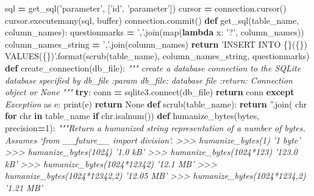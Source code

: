 \documentclass[12pt,oneside]{reedthesis}
\newenvironment{Shaded}{\begin{snugshade}}{\end{snugshade}}
\newcommand{\KeywordTok}[1]{\textcolor[rgb]{0.13,0.29,0.53}{\textbf{#1}}}
\newcommand{\DecValTok}[1]{\textcolor[rgb]{0.00,0.00,0.81}{#1}}
\newcommand{\SpecialCharTok}[1]{\textcolor[rgb]{0.00,0.00,0.00}{#1}}
\newcommand{\StringTok}[1]{\textcolor[rgb]{0.31,0.60,0.02}{#1}}
\newcommand{\ImportTok}[1]{#1}
\newcommand{\CommentTok}[1]{\textcolor[rgb]{0.56,0.35,0.01}{\textit{#1}}}
\newcommand{\VariableTok}[1]{\textcolor[rgb]{0.00,0.00,0.00}{#1}}
\newcommand{\ControlFlowTok}[1]{\textcolor[rgb]{0.13,0.29,0.53}{\textbf{#1}}}
\newcommand{\OperatorTok}[1]{\textcolor[rgb]{0.81,0.36,0.00}{\textbf{#1}}}
\newcommand{\BuiltInTok}[1]{#1}
\newcommand{\ExtensionTok}[1]{#1}
\newcommand{\PreprocessorTok}[1]{\textcolor[rgb]{0.56,0.35,0.01}{\textit{#1}}}
\newcommand{\NormalTok}[1]{#1}
\theoremstyle{definition}
\theoremstyle{definition}
\theoremstyle{definition}
\theoremstyle{remark}
\begin{document}
\begin{Shaded}
\begin{Highlighting}[]
{{{{{\NormalTok{    sql }\OperatorTok{=}\NormalTok{ get_sql(}\StringTok{'parameter'}\NormalTok{, [}\StringTok{'id'}\NormalTok{, }\StringTok{'parameter'}\NormalTok{])}
\NormalTok{    cursor }\OperatorTok{=}\NormalTok{ connection.cursor()}
\NormalTok{    cursor.executemany(sql, }\BuiltInTok{buffer}\NormalTok{)}
\NormalTok{    connection.commit()}
\KeywordTok{def}\NormalTok{ get_sql(table_name, column_names):}
\NormalTok{    questionmarks }\OperatorTok{=} \StringTok{','}\NormalTok{.join(}\BuiltInTok{map}\NormalTok{(}\KeywordTok{lambda}\NormalTok{ x: }\StringTok{'?'}\NormalTok{, column_names))}
\NormalTok{    column_names_string }\OperatorTok{=} \StringTok{','}\NormalTok{.join(column_names)}
    \ControlFlowTok{return} \StringTok{'INSERT INTO }\SpecialCharTok{\{\}}\StringTok{(}\SpecialCharTok{\{\}}\StringTok{) VALUES(}\SpecialCharTok{\{\}}\StringTok{)'}\NormalTok{.}\BuiltInTok{format}\NormalTok{(scrub(table_name), }
\NormalTok{      column_names_string, questionmarks)}
\KeywordTok{def}\NormalTok{ create_connection(db_file):}
    \CommentTok{""" create a database connection to the SQLite database}
\CommentTok{        specified by db_file}
\CommentTok{    :param db_file: database file}
\CommentTok{    :return: Connection object or None}
\CommentTok{    """}
    \ControlFlowTok{try}\NormalTok{:}
\NormalTok{        conn }\OperatorTok{=}\NormalTok{ sqlite3.}\ExtensionTok{connect}\NormalTok{(db_file)}
        \ControlFlowTok{return}\NormalTok{ conn}
    \ControlFlowTok{except} \PreprocessorTok{Exception} \ImportTok{as}\NormalTok{ e:}
        \BuiltInTok{print}\NormalTok{(e)}
    \ControlFlowTok{return} \VariableTok{None}
\KeywordTok{def}\NormalTok{ scrub(table_name):}
    \ControlFlowTok{return} \StringTok{''}\NormalTok{.join( }\BuiltInTok{chr} \ControlFlowTok{for} \BuiltInTok{chr} \KeywordTok{in}\NormalTok{ table_name }\ControlFlowTok{if} \BuiltInTok{chr}\NormalTok{.isalnum())}
\KeywordTok{def}\NormalTok{ humanize_bytes(}\BuiltInTok{bytes}\NormalTok{, precision}\OperatorTok{=}\DecValTok{1}\NormalTok{):}
    \CommentTok{"""Return a humanized string representation of a number of bytes.}
\CommentTok{    Assumes `from __future__ import division`.}
\CommentTok{    >>> humanize_bytes(1)}
\CommentTok{    '1 byte'}
\CommentTok{    >>> humanize_bytes(1024)}
\CommentTok{    '1.0 kB'}
\CommentTok{    >>> humanize_bytes(1024*123)}
\CommentTok{    '123.0 kB'}
\CommentTok{    >>> humanize_bytes(1024*12342)}
\CommentTok{    '12.1 MB'}
\CommentTok{    >>> humanize_bytes(1024*12342,2)}
\CommentTok{    '12.05 MB'}
\CommentTok{    >>> humanize_bytes(1024*1234,2)}
\CommentTok{    '1.21 MB'}
}}}}}
\end{Highlighting}
\end{Shaded}
\end{document}
